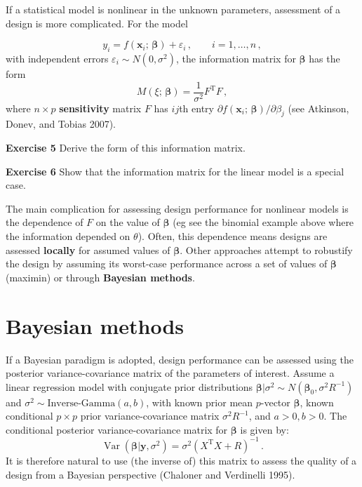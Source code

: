 \documentclass[
]{article}
\begin{document}
If a statistical model is nonlinear in the unknown parameters,
assessment of a design is more complicated. For the model

\[
y_i = f(\boldsymbol{x}_i;\,\boldsymbol{\beta}) + \varepsilon_i\,,\qquad i=1,\ldots,n\,,
\] with independent errors \(\varepsilon_i\sim N(0,\sigma^2)\), the
information matrix for \(\boldsymbol{\beta}\) has the form \[
M(\xi;\,\boldsymbol{\beta}) = \frac{1}{\sigma^2}F^\mathrm{T}F\,,
\] where \(n\times p\) \textbf{sensitivity} matrix \(F\) has \(ij\)th
entry
\(\partial f(\boldsymbol{x}_i;\,\boldsymbol{\beta})/\partial \beta_j\)
(see Atkinson, Donev, and Tobias 2007).

\textbf{Exercise 5} Derive the form of this information matrix.

\textbf{Exercise 6} Show that the information matrix for the linear
model is a special case.

The main complication for assessing design performance for nonlinear
models is the dependence of \(F\) on the value of \(\boldsymbol{\beta}\)
(eg see the binomial example above where the information depended on
\(\theta\)). Often, this dependence means designs are assessed
\textbf{locally} for assumed values of \(\boldsymbol{\beta}\). Other
approaches attempt to robustify the design by assuming its worst-case
performance across a set of values of \(\boldsymbol{\beta}\) (maximin)
or through \textbf{Bayesian methods}.

\hypertarget{bayesian-methods}{%
\section{Bayesian methods}\label{bayesian-methods}}

If a Bayesian paradigm is adopted, design performance can be assessed
using the posterior variance-covariance matrix of the parameters of
interest. Assume a linear regression model with conjugate prior
distributions
\(\boldsymbol{\beta}| \sigma^2 \sim N(\boldsymbol{\beta}_0, \sigma^2R^{-1})\)
and \(\sigma^2\sim\text{Inverse-Gamma}(a, b)\), with known prior mean
\(p\)-vector \(\boldsymbol{\beta}\), known conditional \(p\times p\)
prior variance-covariance matrix \(\sigma^2R^{-1}\), and \(a>0, b>0\).
The conditional posterior variance-covariance matrix for
\(\boldsymbol{\beta}\) is given by: \[
\operatorname{Var}(\boldsymbol{\beta}| \boldsymbol{y}, \sigma^2) = \sigma^2\left(X^\mathrm{T}X + R\right)^{-1}\,.
\] It is therefore natural to use (the inverse of) this matrix to assess
the quality of a design from a Bayesian perspective (Chaloner and
Verdinelli 1995).
\end{document}
